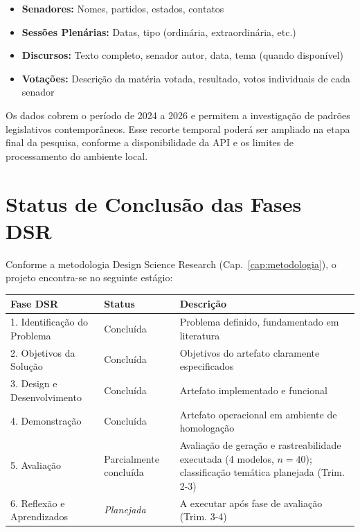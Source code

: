 \begin{itemize}
    \item \textbf{Senadores:} Nomes, partidos, estados, contatos
    \item \textbf{Sessões Plenárias:} Datas, tipo (ordinária, extraordinária, etc.)
    \item \textbf{Discursos:} Texto completo, senador autor, data, tema (quando disponível)
    \item \textbf{Votações:} Descrição da matéria votada, resultado, votos individuais de cada senador
\end{itemize}

Os dados cobrem o período de 2024 a 2026 e permitem a investigação de padrões legislativos contemporâneos. Esse recorte temporal poderá ser ampliado na etapa final da pesquisa, conforme a disponibilidade da API e os limites de processamento do ambiente local.

\section{Status de Conclusão das Fases DSR}

Conforme a metodologia Design Science Research (Cap.\ \ref{cap:metodologia}), o projeto encontra-se no seguinte estágio:

\begin{quadro}[H]
    \centering
    \caption{Progresso das Fases de Design Science Research}
    \label{quad:fases_dsr}
    \begin{tabular}{|p{4.5cm}|>{\centering\arraybackslash}p{2.8cm}|p{7cm}|}
        \hline
        \textbf{Fase DSR} & \textbf{Status} & \textbf{Descrição} \\
        \hline
        1. Identificação do Problema & Concluída & Problema definido, fundamentado em literatura \\
        \hline
        2. Objetivos da Solução & Concluída & Objetivos do artefato claramente especificados \\
        \hline
        3. Design e Desenvolvimento & Concluída & Artefato implementado e funcional \\
        \hline
        4. Demonstração & Concluída & Artefato operacional em ambiente de homologação \\
        \hline
        5. Avaliação & Parcialmente concluída & Avaliação de geração e rastreabilidade executada (4 modelos, $n=40$); classificação temática planejada (Trim. 2-3) \\
        \hline
        6. Reflexão e Aprendizados & \textit{Planejada} & A executar após fase de avaliação (Trim. 3-4) \\
        \hline
    \end{tabular}
\end{quadro}

